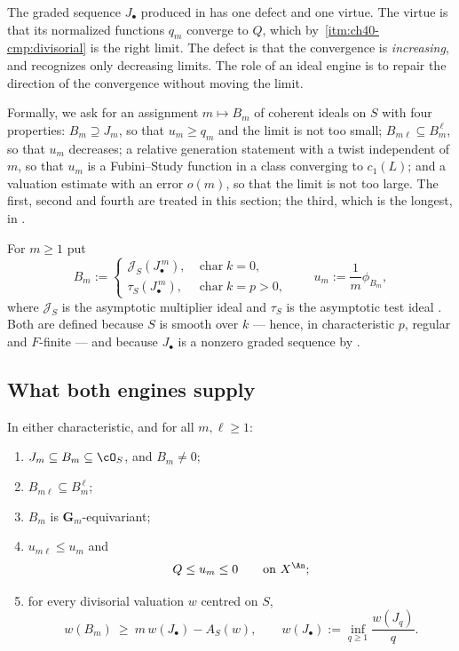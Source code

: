 The graded sequence $J_\bullet$ produced in 
has one defect and one virtue.  The virtue is that its normalized functions
$q_m$ converge to $Q$, which by
\,\cref{itm:ch40-cmp:divisorial} is the
right limit.  The defect is that the convergence is \emph{increasing}, and
 recognizes only decreasing limits.  The role of an ideal
engine is to repair the direction of the convergence without moving the
limit.

Formally, we ask for an assignment $m\mapsto B_m$ of coherent ideals on
$S$ with four properties: $B_m\supseteq J_m$, so that $u_m\ge q_m$ and
the limit is not too small; $B_{m\ell}\subseteq B_m^{\,\ell}$, so that
$u_m$ decreases; a relative generation statement with a twist independent
of $m$, so that $u_m$ is a Fubini--Study function in a class converging
to $c_1(L)$; and a valuation estimate with an error $o(m)$, so that the
limit is not too large.  The first, second and fourth are treated in this
section; the third, which is the longest, in .

\begin{definition}
\label{def:ch40-stage-ideals}
For $m\ge1$ put
\[
 B_m:=
 \begin{cases}
 \mathcal J_S(J_\bullet^{\,m}),
      &\operatorname{char}k=0,\\[2pt]
 \tau_S(J_\bullet^{\,m}),
      &\operatorname{char}k=p>0,
 \end{cases}
 \qquad
 u_m:=\frac1m\phi_{B_m},
\]
where $\mathcal J_S$ is the asymptotic multiplier ideal
 and $\tau_S$ is the asymptotic test
ideal .  Both are defined because $S$ is
smooth over $k$ --- hence, in characteristic $p$, regular and
$F$-finite --- and because $J_\bullet$ is a nonzero graded sequence by
.
\end{definition}

\subsection{What both engines supply}
\label{sec:ch40-engine-package}

\begin{proposition}
\label{prop:ch40-engine-package}
In either characteristic, and for all $m,\ell\ge1$:
\begin{enumerate}
\item\label{itm:ch40-eng:contain}
 $J_m\subseteq B_m\subseteq\cO_S$, and $B_m\ne0$;
\item\label{itm:ch40-eng:subadd}
 $B_{m\ell}\subseteq B_m^{\,\ell}$;
\item\label{itm:ch40-eng:equivariant}
 $B_m$ is $\mathbf G_m$-equivariant;
\item\label{itm:ch40-eng:sandwich}
 $u_{m\ell}\le u_m$ and
 \[
  Q\le u_m\le0\qquad\text{on }X^{\An};
 \]
\item\label{itm:ch40-eng:valuation}
 for every divisorial valuation $w$ centred on $S$,
 \[
  w(B_m)\ \ge\ m\,w(J_\bullet)-A_S(w),
  \qquad
  w(J_\bullet):=\inf_{q\ge1}\frac{w(J_q)}{q}.
 \]
\end{enumerate}
\end{proposition}

